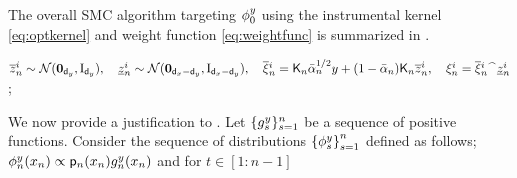 The overall SMC algorithm targeting $\filter{0}{\lmeas}{}$ using the instrumental kernel \eqref{eq:optkernel} and weight function \eqref{eq:weightfunc} is summarized in .
\begin{algorithm2e}
    \small
    \caption{\algo\ ($\sigma = 0$)}
    \label{alg:algonoiseless} 
    $\overline{z}^i _{n} \sim \normpdf(\mathbf{0}_{\dimorig}, \idm_{\dimorig}), \quad \underline{z}^i _{n} \sim \normpdf(\mathbf{0}_{\dimx - \dimorig}, \idm_{\dimx - \dimorig}), \quad \tparticle^i _n = \mathsf{K}_n \alphacumprod{n}{}^{1/2} \lmeas + (1 - \alphacumprod{n}{}) \mathsf{K} _n \overline{z}^i _n , \quad \particle^i _n = \cat{\tparticle^i _n}{\underline{z}^i _n}$;\\
    \end{algorithm2e}
We now provide a justification to . Let $\{ \pot{s}{\lmeas}{} \}_{s = 1} ^{n}$ be a sequence of positive functions. Consider the sequence of distributions $\left\{\smash{\filter{s}{\lmeas}{}}\right\}_{s=1}^{n}$ defined as follows; $\filter{n}{\lmeas}{\lstate_n} \propto \bwmarg{n}{\lstate_n} \pot{n}{\lmeas}{\lstate_n}$ and for $t \in [1:n-1]$
